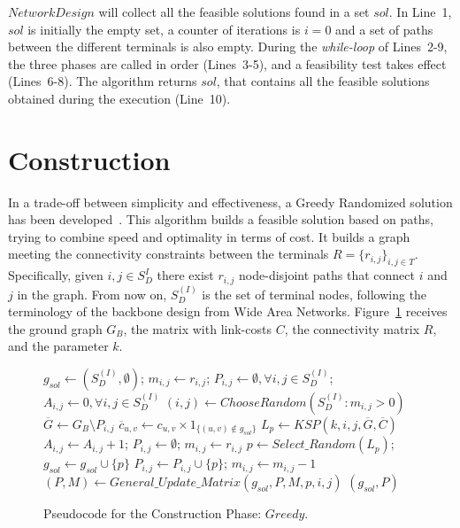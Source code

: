 $NetworkDesign$ will collect all the feasible solutions found in a set $sol$. In Line~1, $sol$ 
is initially the empty set, a counter of iterations is $i=0$ and a set of paths between the different terminals is also empty.  
During the \textit{while-loop} of Lines~2-9, the three phases are called in order (Lines~3-5), 
and a feasibility test takes effect (Lines~6-8). The algorithm returns $sol$, that contains 
all the feasible solutions obtained during the execution (Line~10). 


\section{Construction}
In a trade-off between simplicity and effectiveness, a Greedy Randomized solution has been 
developed~\cite{8,11}. This algorithm builds a feasible solution based on paths, trying to combine 
speed and optimality in terms of cost. It builds a graph meeting the 
connectivity constraints between the terminals $R= \{r_{i,j}\}_{i,j\in T}$. 
Specifically, given $i,j \in S_{D}^{I}$ there exist $r_{i,j}$ node-disjoint paths 
that connect $i$ and $j$ in the graph. From now on, $S_{D}^{(I)}$ is the set of 
terminal nodes, following the terminology of the backbone design from Wide Area Networks. 
Figure~\ref{const} receives the ground graph $G_B$, the matrix with link-costs $C$, 
the connectivity matrix $R$, and the parameter $k$.

\begin{figure}[H]
\begin{algorithm}[H]
\caption{$(sol,P) = Greedy(G_B,C,R,k)$}
\begin{algorithmic}[1]
\STATE $g_{sol} \leftarrow (S_D^{(I)},\emptyset)$; $m_{i,j}\leftarrow r_{i,j}$; $P_{i,j}\leftarrow \emptyset, \forall i,j \in S_{D}^{(I)}$; $A_{i,j}\leftarrow 0, \forall i,j \in S_{D}^{(I)}$
\STATE $(i,j) \leftarrow ChooseRandom(S_{D}^{(I)}: m_{i,j}>0)$
\STATE $\overline{G} \leftarrow G_B \setminus P_{i,j}$
\STATE $\overline{c}_{u,v} \leftarrow c_{u,v} \times 1_{\{(u,v) \notin g_{sol}\}}$
\ENDFOR
\STATE $L_p \leftarrow KSP(k,i,j,\overline{G},\overline{C})$
\STATE $A_{i,j} \leftarrow A_{i,j}+1$; $P_{i,j} \leftarrow \emptyset$; $m_{i,j}\leftarrow r_{i,j}$ 
\ELSE 
\STATE $p \leftarrow Select\_Random(L_p)$; $g_{sol} \leftarrow g_{sol} \cup \{p\}$
\STATE $P_{i,j} \leftarrow P_{i,j} \cup \{p\}$; $m_{i,j} \leftarrow m_{i,j}-1$
\STATE $(P,M) \leftarrow General\_Update\_Matrix(g_{sol},P,M,p,i,j)$
\ENDIF
\ENDWHILE
\RETURN $(g_{sol},P)$
\end{algorithmic}
\end{algorithm}
\caption{Pseudocode for the Construction Phase: $Greedy$. \label{const}}
\end{figure}

